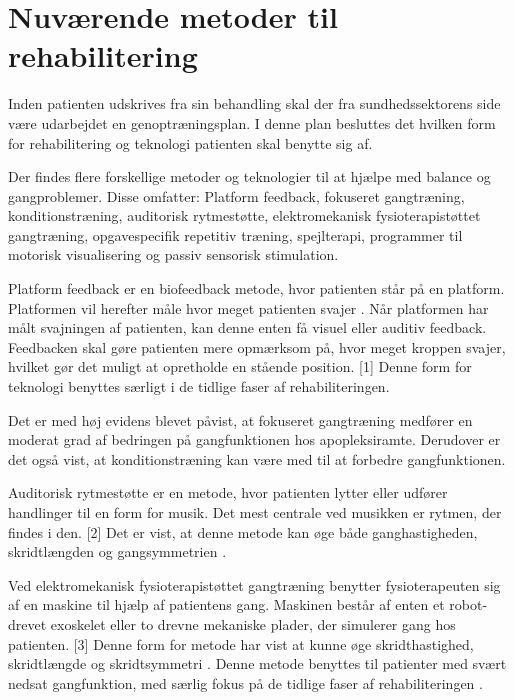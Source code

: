 \section{Nuværende metoder til rehabilitering}

Inden patienten udskrives fra sin behandling skal der fra sundhedssektorens side være udarbejdet en genoptræningsplan. I denne plan besluttes det hvilken form for rehabilitering og teknologi patienten skal benytte sig af. \cite{Sundhedsstyrelsen2011a}

Der findes flere forskellige metoder og teknologier til at hjælpe med balance og gangproblemer. Disse omfatter: Platform feedback, fokuseret gangtræning, konditionstræning, auditorisk rytmestøtte, elektromekanisk fysioterapistøttet gangtræning, opgavespecifik repetitiv træning, spejlterapi, programmer til motorisk visualisering og passiv sensorisk stimulation. \cite{Sundhedsstyrelsen2011a}

Platform feedback er en biofeedback metode, hvor patienten står på en platform. Platformen vil herefter måle hvor meget patienten svajer . Når platformen har målt svajningen af patienten, kan denne enten få visuel eller auditiv feedback. Feedbacken skal gøre patienten mere opmærksom på, hvor meget kroppen svajer, hvilket gør det muligt at opretholde en stående position. [1]
Denne form for teknologi benyttes særligt i de tidlige faser af rehabiliteringen\cite{Sundhedsstyrelsen2011a}.

Det er med høj evidens blevet påvist, at fokuseret gangtræning medfører en moderat grad af bedringen på gangfunktionen hos apopleksiramte\cite{Sundhedsstyrelsen2010}. Derudover er det også vist, at konditionstræning kan være med til at forbedre gangfunktionen\cite{Sundhedsstyrelsen2010}. 

Auditorisk rytmestøtte er en metode, hvor patienten lytter eller udfører handlinger til en form for musik. Det mest centrale ved musikken er rytmen, der findes i den. [2] Det er vist, at denne metode kan øge både ganghastigheden, skridtlængden og gangsymmetrien \cite{Sundhedsstyrelsen2010}. 

Ved elektromekanisk fysioterapistøttet gangtræning benytter fysioterapeuten sig af en maskine til hjælp af patientens gang. Maskinen består af enten et robot-drevet exoskelet eller to drevne mekaniske plader, der simulerer gang hos patienten. [3] Denne form for metode har vist at kunne øge skridthastighed, skridtlængde og skridtsymmetri \cite{Sundhedsstyrelsen2010}. Denne metode benyttes til patienter med svært nedsat gangfunktion, med særlig fokus på de tidlige faser af rehabiliteringen \cite{Sundhedsstyrelsen2011a}.

